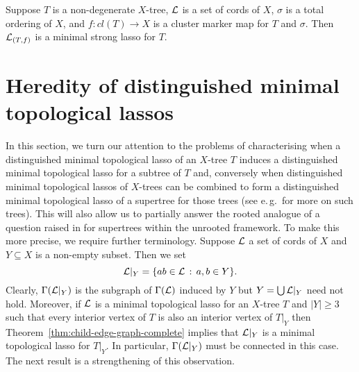 \begin{cor}
  \label{corollary:strong-lasso-characterization}
  Suppose $T$ is a non-degenerate $X$-tree, ${\mathcal L}$ is a set of cords of $X$,
  $\sigma$ is a total ordering of $X$, and $f:cl(T)\to X$ is a cluster marker
  map for $T$ and $\sigma$.  Then ${\mathcal L}_{(T,f)}$ is a minimal strong lasso for
  $T$.
\end{cor}

\section{Heredity of distinguished minimal topological lassos}
\label{sec:subtree}

In this section, we turn our attention to the problems of characterising when
a distinguished minimal topological lasso of an $X$-tree $T$ induces a
distinguished minimal topological lasso for a subtree of $T$ and, conversely
when distinguished minimal topological lassos of $X$-trees can be combined to
form a distinguished minimal topological lasso of a supertree for those trees
(see e.\,g.\,\cite{bininda04phylogenetic} for more on such trees). This will
also allow us to partially answer the rooted analogue of a question raised in
\cite{dress11lassoing} for supertrees within the unrooted framework.  To make
this more precise, we require further terminology.  Suppose ${\mathcal L}$ a set of
cords of $X$ and $Y\subseteq X$ is a non-empty subset. Then we set
$$
{\mathcal L}|_Y=\{ab\in{\mathcal L}\,:\, a,b\in Y\}.
$$
Clearly, $\Gamma({\mathcal L}|_Y)$ is the subgraph of $\Gamma({\mathcal L})$ induced by $Y$ but
$Y=\bigcup {\mathcal L}|_Y$ need not hold. Moreover, if ${\mathcal L}$ is a minimal topological
lasso for an $X$-tree $T$ and $|Y|\geq 3$ such that every interior vertex of
$T$ is also an interior vertex of $T|_Y$ then
Theorem~\ref{thm:child-edge-graph-complete} implies that ${\mathcal L}|_Y$ is a
minimal topological lasso for $T|_Y$. In particular, $\Gamma({\mathcal L}|_Y)$ must be
connected in this case.  The next result is a strengthening of this
observation.

